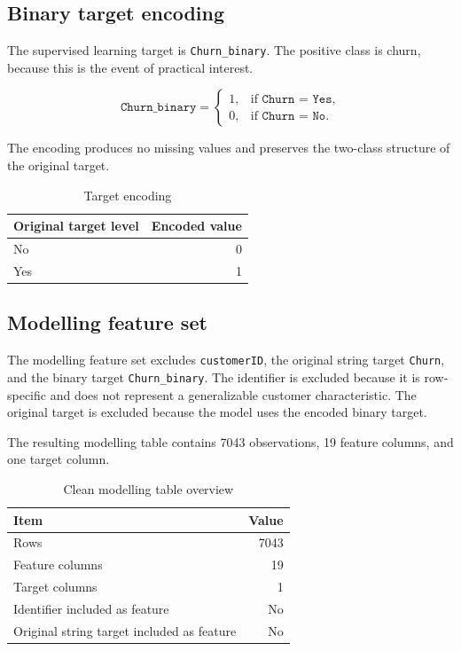 \subsection{Binary target encoding}

The supervised learning target is \texttt{Churn\_binary}. The positive class is churn, because this is the event of practical interest.

\[
\texttt{Churn\_binary} =
\begin{cases}
1, & \text{if } \texttt{Churn = Yes},\\
0, & \text{if } \texttt{Churn = No}.
\end{cases}
\]

The encoding produces no missing values and preserves the two-class structure of the original target.

\begin{table}[H]
\centering
\caption{Target encoding}
\begin{tabular}{lr}
\toprule
Original target level & Encoded value \\
\midrule
No & 0 \\
Yes & 1 \\
\bottomrule
\end{tabular}
\end{table}

\subsection{Modelling feature set}

The modelling feature set excludes \texttt{customerID}, the original string target \texttt{Churn}, and the binary target \texttt{Churn\_binary}. The identifier is excluded because it is row-specific and does not represent a generalizable customer characteristic. The original target is excluded because the model uses the encoded binary target.

The resulting modelling table contains 7043 observations, 19 feature columns, and one target column.

\begin{table}[H]
\centering
\caption{Clean modelling table overview}
\begin{tabular}{lr}
\toprule
Item & Value \\
\midrule
Rows & 7043 \\
Feature columns & 19 \\
Target columns & 1 \\
Identifier included as feature & No \\
Original string target included as feature & No \\
\bottomrule
\end{tabular}
\end{table}

